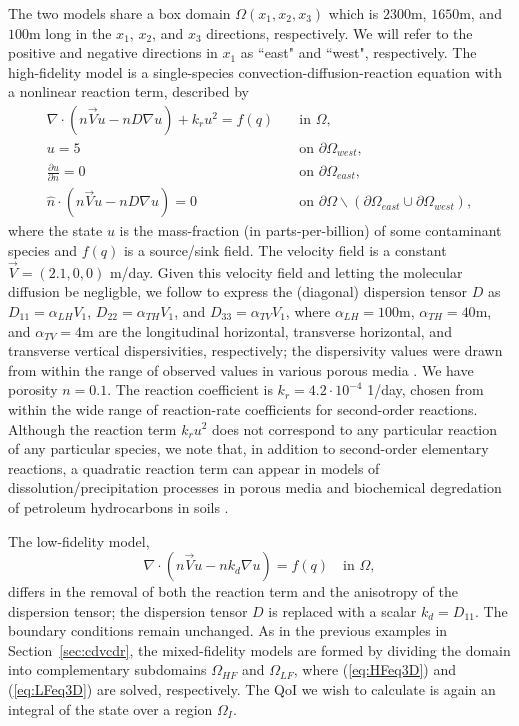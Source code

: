 The two models share a box domain $\Omega(x_1,x_2,x_3)$ which is $2300$m, $1650$m, and $100$m long in the $x_1$, $x_2$, and $x_3$ directions, respectively. We will refer to the positive and negative directions in $x_1$ as ``east" and ``west", respectively. The high-fidelity model is a single-species convection-diffusion-reaction equation with a nonlinear reaction term, described by
%
\begin{subequations}
\label{eq:cdvcdrHF3D}
\begin{align}
\nabla\cdot(n\vec{V}u - nD\nabla u) + k_ru^2 = f(q) \quad &\text{in } \Omega, \label{eq:HFeq3D}\\
u = 5 \quad &\text{on } \partial \Omega_{west}, \\
\frac{\partial u}{\partial n} = 0 \quad &\text{on }\partial\Omega_{east}, \\
\hat{n}\cdot(n\vec{V}u - nD\nabla u) = 0 \quad &\text{on }\partial\Omega\backslash(\partial\Omega_{east}\cup\partial\Omega_{west}),
\end{align} 
\end{subequations}
%
where the state $u$ is the mass-fraction (in parts-per-billion) of some contaminant species and $f(q)$ is a source/sink field. The velocity field is a constant $\vec{V}=(2.1,0,0)$ m/day. Given this velocity field and letting the molecular diffusion be negligble, we follow \cite{Vestedetal93} to express the (diagonal) dispersion tensor $D$ as $D_{11}=\alpha_{LH}V_1$, $D_{22}=\alpha_{TH}V_1$, and $D_{33}=\alpha_{TV}V_1$, where $\alpha_{LH}=100$m, $\alpha_{TH}=40$m, and $\alpha_{TV}=4$m are the longitudinal horizontal, transverse horizontal, and transverse vertical dispersivities, respectively; the dispersivity values were drawn from within the range of observed values in various porous media \cite{Davis86}. We have porosity $n=0.1$. The reaction coefficient is $k_r=4.2\cdot10^{-4}$ 1/day, chosen from within the wide range of reaction-rate coefficients for second-order reactions. Although the reaction term $k_ru^2$ does not correspond to any particular reaction of any particular species, we note that, in addition to second-order elementary reactions, a quadratic reaction term can appear in models of dissolution/precipitation processes in porous media \cite{Aha97} and biochemical degredation of petroleum hydrocarbons in soils \cite{Jack94}.

The low-fidelity model,
%
\begin{equation}
\nabla\cdot(n\vec{V}u - nk_d\nabla u) = f(q) \quad \text{in } \Omega, \label{eq:LFeq3D}
\end{equation}
%
differs in the removal of both the reaction term and the anisotropy of the dispersion tensor; the dispersion tensor $D$ is replaced with a scalar $k_d=D_{11}$. The boundary conditions remain unchanged. As in the previous examples in Section~\ref{sec:cdvcdr}, the mixed-fidelity models are formed by dividing the domain into complementary subdomains $\Omega_{HF}$ and $\Omega_{LF}$, where (\ref{eq:HFeq3D}) and (\ref{eq:LFeq3D}) are solved, respectively. The QoI we wish to calculate is again an integral of the state over a region $\Omega_I$. 

